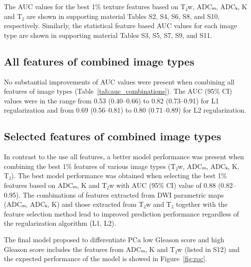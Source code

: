 The AUC values for the best 1\% texture features based on T₂w, ADCₘ, ADCₖ, K
and T₂ are shown in supporting material Tables S2, S4, S6, S8, and S10,
respectively. Similarly, the statistical feature based AUC values for each image
type are shown in supporting material Tables S3, S5, S7, S9, and S11.


\subsection{All features of combined image types}

No substantial improvements of AUC values were present when combining all
features of image types (Table~\ref{tab:auc_combinations}). The AUC (95\% CI)
values were in the range from 0.53 (0.40--0.66) to 0.82 (0.73--0.91) for L1
regularization and from 0.69 (0.56--0.81) to 0.80 (0.71--0.89) for L2
regularization.


\subsection{Selected features of combined image types}

In contrast to the use all features, a better model performance was present when
combining the best 1\% features of various image types (T₂w, ADCₘ, ADCₖ, K,
T₂). The best model performance was obtained when selecting the best 1\%
features based on ADCₘ, K and T₂w with AUC (95\% CI) value of 0.88
(0.82--0.95). The combinations of features extracted from DWI parametric maps
(ADCₘ, ADCₖ, K) and those extracted from T₂w and T₂ together with the
feature selection method lead to improved prediction performance regardless of
the regularization algorithm (L1, L2).

The final model proposed to differentiate PCa low Gleason score and high Gleason
score includes the features from ADCₘ, K and T₂w (listed in S12) and the
expected performance of the model is showed in Figure~\ref{fig:roc}.
